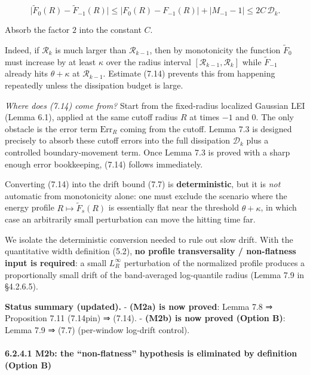 \documentclass[
  11pt,
]{article}
\begin{document}
\begin{equation}
\big|\widetilde F_0(R)-\widetilde F_{-1}(R)\big|
\le |F_0(R)-F_{-1}(R)|+|M_{-1}-1|
\le 2C\,\mathcal D_k.
\tag{7.14b}
\end{equation}

Absorb the factor \(2\) into the constant \(C\).

Indeed, if \(\mathcal R_k\) is much larger than \(\mathcal R_{k-1}\), then by monotonicity the function \(\widetilde F_0\) must increase by at least \(\kappa\) over the radius interval \([\mathcal R_{k-1},\mathcal R_k]\) while \(\widetilde F_{-1}\) already hits \(\theta+\kappa\) at \(\mathcal R_{k-1}\). Estimate (7.14) prevents this from happening repeatedly unless the dissipation budget is large.

\emph{Where does (7.14) come from?} Start from the fixed-radius localized Gaussian LEI (Lemma 6.1), applied at the same cutoff radius \(R\) at times \(-1\) and \(0\). The only obstacle is the error term \(\mathrm{Err}_R\) coming from the cutoff. Lemma 7.3 is designed precisely to absorb these cutoff errors into the full dissipation \(\mathcal D_k\) plus a controlled boundary-movement term. Once Lemma 7.3 is proved with a sharp enough error bookkeeping, (7.14) follows immediately.

Converting (7.14) into the drift bound (7.7) is \textbf{deterministic}, but it is \emph{not} automatic from monotonicity alone: one must exclude the scenario where the energy profile \(R\mapsto \widetilde F_s(R)\) is essentially flat near the threshold \(\theta+\kappa\), in which case an arbitrarily small perturbation can move the hitting time far.

We isolate the deterministic conversion needed to rule out slow drift. With the quantitative width definition (5.2), \textbf{no profile transversality / non-flatness input is required}: a small \(L^\infty_R\) perturbation of the normalized profile produces a proportionally small drift of the band-averaged log-quantile radius (Lemma 7.9 in §4.2.6.5).

\textbf{Status summary (updated).} - \textbf{(M2a) is now proved}: Lemma 7.8 ⇒ Proposition 7.11 (7.14pin) ⇒ (7.14). - \textbf{(M2b) is now proved (Option B)}: Lemma 7.9 ⇒ (7.7) (per-window log-drift control).

\hypertarget{m2b-the-non-flatness-hypothesis-is-eliminated-by-definition-option-b}{%
\paragraph{6.2.4.1 M2b: the ``non-flatness'' hypothesis is eliminated by definition (Option B)}\label{m2b-the-non-flatness-hypothesis-is-eliminated-by-definition-option-b}}
\end{document}
